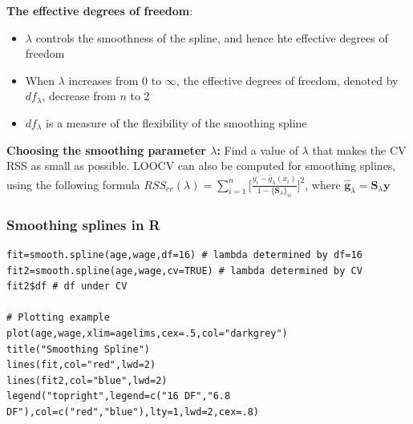 \documentclass[11pt]{article}
\begin{document}
\noindent \textbf{The effective degrees of freedom}:
\begin{itemize}
    \item $\lambda$ controls the smoothness of the spline, and hence hte effective degrees of freedom
    \item When $\lambda$ increases from $0$ to $\infty$, the effective degrees of freedom, denoted by $df_\lambda$, decrease from $n$ to $2$
    \item $df_\lambda$ is a measure of the flexibility of the smoothing spline
\end{itemize} \phantom{i}

\noindent \textbf{Choosing the smoothing parameter $\lambda$:} Find a value of $\lambda$ that makes the CV RSS as small as possible. LOOCV can also be computed for smoothing splines, using the following formula $RSS_{cv}(\lambda) = \sum_{i=1}^{n}{\Big[ \frac{y_i - \hat{g}_{\lambda}(x_i)}{1 - \{ \boldsymbol{S}_\lambda \}_{ii}} \Big]^2}$, where $\hat{\boldsymbol{g}}_\lambda = \boldsymbol{S}_{\lambda} \boldsymbol{y}$

\subsubsection{Smoothing splines in R}
\begin{lstlisting}
fit=smooth.spline(age,wage,df=16) # lambda determined by df=16
fit2=smooth.spline(age,wage,cv=TRUE) # lambda determined by CV
fit2$df # df under CV

# Plotting example
plot(age,wage,xlim=agelims,cex=.5,col="darkgrey")
title("Smoothing Spline")
lines(fit,col="red",lwd=2)
lines(fit2,col="blue",lwd=2)
legend("topright",legend=c("16 DF","6.8 DF"),col=c("red","blue"),lty=1,lwd=2,cex=.8)
\end{lstlisting}
\end{document}
